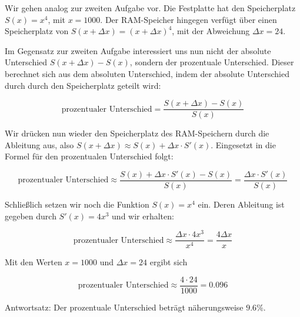 \item Wir gehen analog zur zweiten Aufgabe vor. Die Festplatte hat den Speicherplatz $S(x) = x^4$, mit $x=1000$. Der RAM-Speicher
hingegen verfügt über einen Speicherplatz von $S(x+\Delta x) = (x+\Delta x)^4$, mit der Abweichung $\Delta x = 24$.

Im Gegensatz zur zweiten Aufgabe interessiert uns nun nicht der absolute Unterschied $S(x+\Delta x)-S(x)$, sondern der prozentuale Unterschied.
Dieser berechnet sich aus dem absoluten Unterschied, indem der absolute Unterschied durch durch den Speicherplatz geteilt wird:

$$\text{prozentualer Unterschied} = \frac{S(x+\Delta x)-S(x)}{S(x)}$$

Wir drücken nun wieder den Speicherplatz des RAM-Speichern durch die Ableitung aus, also $S(x+\Delta x) \approx S(x) + \Delta x \cdot S'(x)$. Eingesetzt
in die Formel für den prozentualen Unterschied folgt:

$$\text{prozentualer Unterschied} \approx \frac{S(x) + \Delta x \cdot S'(x)-S(x)}{S(x)} = \frac{\Delta x \cdot S'(x)}{S(x)}$$

Schließlich setzen wir noch die Funktion $S(x) = x^4$ ein. Deren Ableitung ist gegeben durch $S'(x) = 4x^3$ und wir erhalten:

$$\text{prozentualer Unterschied} \approx \frac{\Delta x \cdot 4x^3}{x^4} = \frac{4\Delta x}{x}$$

Mit den Werten $x=1000$ und $\Delta x = 24$ ergibt sich

$$\text{prozentualer Unterschied} \approx \frac{4 \cdot 24}{1000} = 0.096$$

Antwortsatz: Der prozentuale Unterschied beträgt näherungsweise $9.6\%$.

